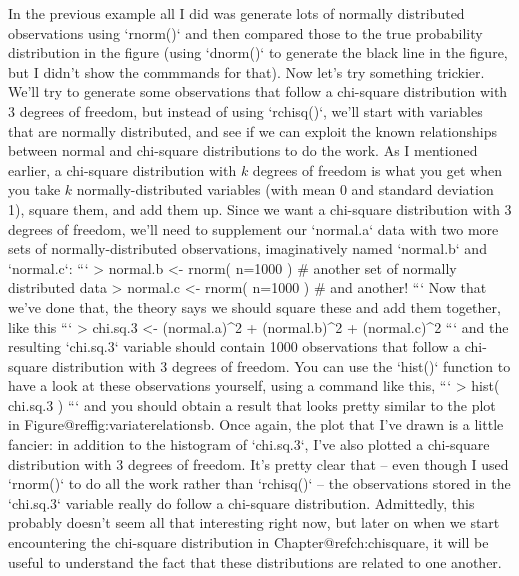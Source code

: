 In the previous example all I did was generate lots of normally distributed observations using `rnorm()` and then compared those to the true probability distribution in the figure (using `dnorm()` to generate the black line in the figure, but I didn't show the commmands for that). Now let's try something trickier. We'll try to generate some observations that follow a chi-square distribution with 3 degrees of freedom, but instead of using `rchisq()`, we'll start with variables that are normally distributed, and see if we can exploit the known relationships between normal and chi-square distributions to do the work. As I mentioned earlier, a chi-square distribution with $k$ degrees of freedom is what you get when you take $k$ normally-distributed variables (with mean 0 and standard deviation 1), square them, and add them up. Since we want a chi-square distribution with 3 degrees of freedom, we'll need to supplement our `normal.a` data with two more sets of normally-distributed observations, imaginatively named `normal.b` and `normal.c`:
```
> normal.b <- rnorm( n=1000 )  # another set of normally distributed data
> normal.c <- rnorm( n=1000 )  # and another!
```
Now that we've done that, the theory says we should square these and add them together, like this
```
> chi.sq.3 <- (normal.a)^2 + (normal.b)^2 + (normal.c)^2	
```
and the resulting `chi.sq.3` variable should contain 1000 observations that follow a chi-square distribution with 3 degrees of freedom. You can use the `hist()` function to have a look at these observations yourself, using a command like this,
```
> hist( chi.sq.3 )  
```
and you should obtain a result that looks pretty similar to the plot in Figure@reffig:variaterelationsb. Once again, the plot that I've drawn is a little fancier: in addition to the histogram of `chi.sq.3`, I've also plotted a chi-square distribution with 3 degrees of freedom. It's pretty clear that -- even though I used `rnorm()` to do all the work rather than `rchisq()` -- the observations stored in the `chi.sq.3` variable really do follow a chi-square distribution. Admittedly, this probably doesn't seem all that interesting right now, but later on when we start encountering the chi-square distribution in Chapter@refch:chisquare, it will be useful to understand the fact that these distributions are related to one another. 

